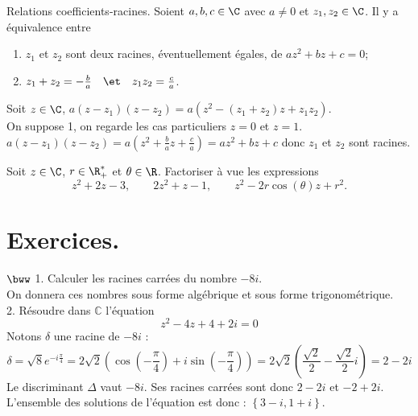 \documentclass[11pt]{article}
\begin{document}
\begin{prop}{Relations coefficients-racines.}{}
    Soient $a,b,c\in\C$ avec $a\neq0$ et $z_1,z_2\in\C$. Il y a équivalence entre
    \begin{enumerate}
        \item $z_1$ et $z_2$ sont deux racines, éventuellement égales, de $az^2+bz+c=0$;
        \item $z_1+z_2=-\frac{b}{a}\quad\et\quad z_1z_2=\frac{c}{a}$.
    \end{enumerate}
    \tcblower
    Soit $z\in\C$, $a(z-z_1)(z-z_2)=a(z^2-(z_1+z_2)z+z_1z_2)$.\\
    \boxed{\ra} On suppose 1, on regarde les cas particuliers $z=0$ et $z=1$.\\
    \boxed{\la} $a(z-z_1)(z-z_2)=a(z^2+\frac{b}{a}z+\frac{c}{a})=az^2+bz+c$ donc $z_1$ et $z_2$ sont racines.
\end{prop}

\begin{ex}{}{}
    Soit $z\in\C$, $r\in\R^*_+$ et $\theta\in\R$. Factoriser à vue les expressions
    \begin{equation*}
        z^2+2z-3, \qquad 2z^2+z-1, \qquad z^2-2r\cos(\theta)z+r^2.
    \end{equation*}
\end{ex}

\section{Exercices.}

\begin{exercice}{$\bww$}{}
    1. Calculer les racines carrées du nombre $-8i$.\\
    On donnera ces nombres sous forme algébrique et sous forme trigonométrique.\\
    2. Résoudre dans $\mathbb{C}$ l'équation
    \begin{equation*}
        z^2 - 4z + 4 + 2i = 0
    \end{equation*}
    \tcblower
     Notons $\delta$ une racine de $-8i$ :
    \begin{equation*}
        \delta = \sqrt{8}e^{-i\frac{\pi}{4}}= 2\sqrt{2}\left(\cos\left( -\frac{\pi}{4} \right) + i\sin\left( -\frac{\pi}{4} \right)\right) = 2\sqrt{2}\left(\frac{\sqrt{2}}{2}-\frac{\sqrt{2}}{2}i\right)=2-2i
    \end{equation*}
     Le discriminant $\Delta$ vaut $-8i$. Ses racines carrées sont donc $2 - 2i$ et $-2+2i$.\\
    L'ensemble des solutions de l'équation est donc : $\left\{3-i, 1 + i\right\}$.
\end{exercice}
\end{document}
